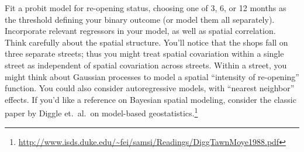 \documentclass{mynotes}
\begin{document}
Fit a probit model for re-opening status, choosing one of 3, 6, or 12 months as the threshold defining your binary outcome (or model them all separately).  Incorporate relevant regressors in your model, as well as spatial correlation.  Think carefully about the spatial structure.  You'll notice that the shops fall on three separate streets; thus you might treat spatial covariation within a single street as independent of spatial covariation across streets.  Within a street, you might think about Gaussian processes to model a spatial ``intensity of re-opening'' function.  You could also consider autoregressive models, with ``nearest neighbor'' effects.  If you'd like a reference on Bayesian spatial modeling, consider the classic paper by Diggle et.~al.~on model-based geostatistics.\footnote{\url{http://www.isds.duke.edu/~fei/samsi/Readings/DiggTawnMoye1988.pdf}}
\end{document}
